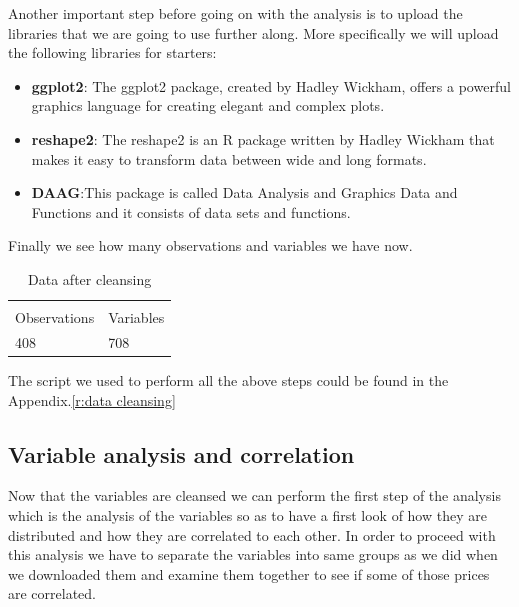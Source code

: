 \documentclass{book}
\begin{document}
Another important step before going on with the analysis is to upload the libraries that we are going to use further along. More specifically we will upload the following libraries for starters:
\begin{itemize}
\item \textbf{ggplot2}: The ggplot2 package, created by Hadley Wickham, offers a powerful graphics language for creating elegant and complex plots.
\item \textbf{reshape2}: The reshape2 is an R package written by Hadley Wickham that makes it easy to transform data between wide and long formats.
\item \textbf{DAAG}:This package is called Data Analysis and Graphics Data and Functions and it consists of data sets and functions.
\end{itemize}
Finally we see how many observations and variables we have now.
\begin{table}[H]
\centering
\caption{Data after cleansing}
\begin{tabular}{ll}
  & \\
Observations & Variables \\
408 & 708 \\
\end{tabular}
\end{table}
The script we used to perform all the above steps could be found in the Appendix.\ref{r:data cleansing}
\subsection{Variable analysis and correlation}
Now that the variables are cleansed we can perform the first step of the analysis which is the analysis of the variables so as to have a first look of how they are distributed and how they are correlated to each other. In order to proceed with this analysis we have to separate the variables into same groups as we did when we downloaded them and examine them together to see if some of those prices are correlated.
\end{document}
